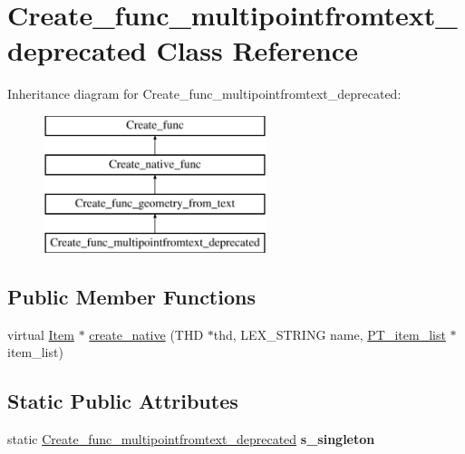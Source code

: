 \hypertarget{classCreate__func__multipointfromtext__deprecated}{}\section{Create\+\_\+func\+\_\+multipointfromtext\+\_\+deprecated Class Reference}
\label{classCreate__func__multipointfromtext__deprecated}
Inheritance diagram for Create\+\_\+func\+\_\+multipointfromtext\+\_\+deprecated\+:\begin{figure}[H]
\begin{center}
\leavevmode
\includegraphics[height=4.000000cm]{classCreate__func__multipointfromtext__deprecated}
\end{center}
\end{figure}
\subsection*{Public Member Functions}
\begin{DoxyCompactItemize}
\item 
virtual \mbox{\hyperlink{classItem}{Item}} $\ast$ \mbox{\hyperlink{classCreate__func__multipointfromtext__deprecated_a0855754fc0c084171c2acc7500603cf3}{create\+\_\+native}} (T\+HD $\ast$thd, L\+E\+X\+\_\+\+S\+T\+R\+I\+NG name, \mbox{\hyperlink{classPT__item__list}{P\+T\+\_\+item\+\_\+list}} $\ast$item\+\_\+list)
\end{DoxyCompactItemize}
\subsection*{Static Public Attributes}
\begin{DoxyCompactItemize}
\item 
\mbox{\label{classCreate__func__multipointfromtext__deprecated_a5014ec7d89b8a6062cf262c61559c200}} 
static \mbox{\hyperlink{classCreate__func__multipointfromtext__deprecated}{Create\+\_\+func\+\_\+multipointfromtext\+\_\+deprecated}} {\bfseries s\+\_\+singleton}
\end{DoxyCompactItemize}
